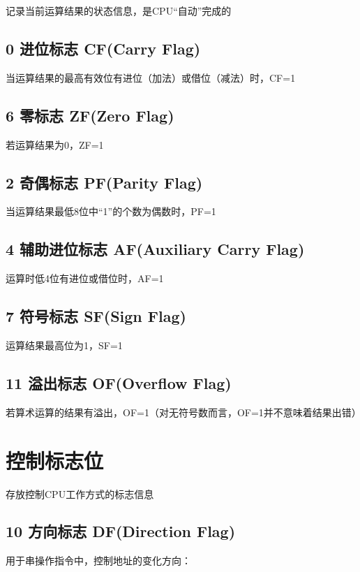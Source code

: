 \documentclass{article}
\begin{document}
记录当前运算结果的状态信息，是CPU“自动”完成的

\subsection{0 进位标志 CF(Carry Flag)}

当运算结果的最高有效位有进位（加法）或借位（减法）时，CF=1

\subsection{6 零标志 ZF(Zero Flag)}

若运算结果为0，ZF=1

\subsection{2 奇偶标志 PF(Parity Flag)}

当运算结果最低8位中“1”的个数为偶数时，PF=1

\subsection{4 辅助进位标志 AF(Auxiliary Carry Flag)}

运算时低4位有进位或借位时，AF=1

\subsection{7 符号标志 SF(Sign Flag)}

运算结果最高位为1，SF=1

\subsection{11 溢出标志 OF(Overflow Flag)}

若算术运算的结果有溢出，OF=1（对无符号数而言，OF=1并不意味着结果出错）

\section{控制标志位}

存放控制CPU工作方式的标志信息

\subsection{10 方向标志 DF(Direction Flag)}

用于串操作指令中，控制地址的变化方向：
\end{document}
